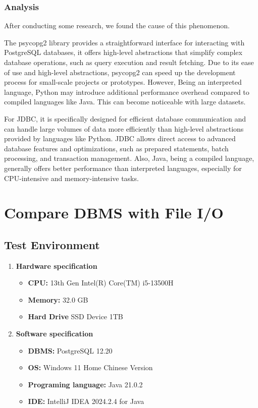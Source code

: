 \documentclass{article}
\begin{document}
\subsubsection{Analysis}
After conducting some research, we found the cause of this phenomenon.

The psycopg2 library provides a straightforward interface for interacting with PostgreSQL databases, it offers high-level abstractions that simplify complex database operations, such as query execution and result fetching. Due to its ease of use and high-level abstractions, psycopg2 can speed up the development process for small-scale projects or prototypes. However, Being an interpreted language, Python may introduce additional performance overhead compared to compiled languages like Java. This can become noticeable with large datasets.

For JDBC, it is specifically designed for efficient database communication and can handle large volumes of data more efficiently than high-level abstractions provided by languages like Python.
JDBC allows direct access to advanced database features and optimizations, such as prepared statements, batch processing, and transaction management. Also, Java, being a compiled language, generally offers better performance than interpreted languages, especially for CPU-intensive and memory-intensive tasks.









\section{Compare DBMS with File I/O }
\subsection{Test Environment}
\begin{enumerate}
\item \textbf{Hardware specification}
\begin{itemize}
\item \textbf{CPU:} 13th Gen Intel(R) Core(TM) i5-13500H
\item \textbf{Memory:} 32.0 GB
\item \textbf{Hard Drive} SSD Device 1TB
\end{itemize}
\item \textbf{Software specification}
\begin{itemize}
\item \textbf{DBMS:} PostgreSQL 12.20
\item \textbf{OS:} Windows 11 Home Chinese Version
\item \textbf{Programing language:} Java 21.0.2
\item \textbf{IDE:} IntelliJ IDEA 2024.2.4 for Java
\end{itemize}
\end{enumerate}
\end{document}
